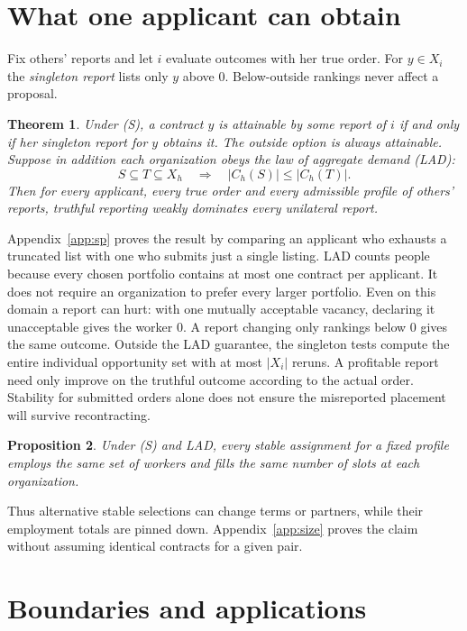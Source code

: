 \documentclass[11pt]{article}
\newtheorem{theorem}{Theorem}
\newtheorem{proposition}[theorem]{Proposition}
\begin{document}
\section{What one applicant can obtain}
Fix others' reports and let $i$ evaluate outcomes with her true order. For $y\in X_i$ the \emph{singleton report} lists only $y$ above $0$. Below-outside rankings never affect a proposal.
\begin{theorem}\label{th:sp}
Under (S), a contract $y$ is attainable by some report of $i$ if and only if her singleton report for $y$ obtains it. The outside option is always attainable. Suppose in addition each organization obeys the law of aggregate demand (LAD):
\[
 S\subseteq T\subseteq X_h\quad\Longrightarrow\quad |C_h(S)|\leq |C_h(T)|.
\]
Then for every applicant, every true order and every admissible profile of others' reports, truthful reporting weakly dominates every unilateral report.
\end{theorem}
Appendix~\ref{app:sp} proves the result by comparing an applicant who exhausts a truncated list with one who submits just a single listing. LAD counts people because every chosen portfolio contains at most one contract per applicant. It does not require an organization to prefer every larger portfolio. Even on this domain a report can hurt: with one mutually acceptable vacancy, declaring it unacceptable gives the worker $0$. A report changing only rankings below $0$ gives the same outcome. Outside the LAD guarantee, the singleton tests compute the entire individual opportunity set with at most $|X_i|$ reruns. A profitable report need only improve on the truthful outcome according to the actual order. Stability for submitted orders alone does not ensure the misreported placement will survive recontracting.

\begin{proposition}\label{prop:size}
Under (S) and LAD, every stable assignment for a fixed profile employs the same set of workers and fills the same number of slots at each organization.
\end{proposition}
Thus alternative stable selections can change terms or partners, while their employment totals are pinned down. Appendix~\ref{app:size} proves the claim without assuming identical contracts for a given pair.

\section{Boundaries and applications}
\end{document}
